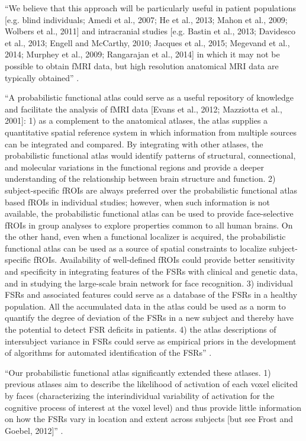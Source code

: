 ``We believe that this approach will be particularly useful in patient
populations [e.g. blind individuals; Amedi et al., 2007; He et al., 2013; Mahon
et al., 2009; Wolbers et al., 2011] and intracranial studies [e.g. Bastin et
al., 2013; Davidesco et al., 2013; Engell and McCarthy, 2010; Jacques et al.,
2015; Megevand et al., 2014; Murphey et al., 2009; Rangarajan et al., 2014] in
which it may not be possible to obtain fMRI data, but high resolution anatomical
MRI data are typically obtained'' \citep{weiner2018defining}.


``A probabilistic functional atlas could serve as a useful repository of
knowledge and facilitate the analysis of fMRI data [Evans et al., 2012;
Mazziotta et al., 2001]:
%
1) as a complement to the anatomical atlases, the atlas supplies a quantitative
spatial reference system in which information from multiple sources can be
integrated and compared.
%
By integrating with other atlases, the probabilistic functional atlas would
identify patterns of structural, connectional, and molecular variations in the
functional regions and provide a deeper understanding of the relationship
between brain structure and function.
%
2) subject-specific fROIs are always preferred over the probabilistic functional
atlas based fROIs in individual studies;
%
however, when such information is not available, the probabilistic functional
atlas can be used to provide face-selective fROIs in group analyses to explore
properties common to all human brains.
%
On the other hand, even when a functional localizer is acquired, the
probabilistic functional atlas can be used as a source of spatial constraints to
localize subject-specific fROIs.
%
Availability of well-defined fROIs could provide better sensitivity and
specificity in integrating features of the FSRs with clinical and genetic data,
and in studying the large-scale brain network for face recognition.
%
3) individual FSRs and associated features could serve as a
database of the FSRs in a healthy population.
%
All the accumulated data in the atlas could be used as a norm to quantify the
degree of deviation of the FSRs in a new subject and thereby have the potential
to detect FSR deficits in patients.
%
4) the atlas descriptions of intersubject variance in FSRs could serve as
empirical priors in the development of algorithms for automated identification
of the FSRs'' \citep{zhen2015quantifying}.

``Our probabilistic functional atlas significantly extended these atlases.
%
1) previous atlases aim to describe the likelihood of activation of each voxel
elicited by faces (characterizing the interindividual variability of activation
for the cognitive process of interest at the voxel level) and thus provide
little information on how the FSRs vary in location and extent across subjects
[but see Frost and Goebel, 2012]'' \citep{zhen2015quantifying}.


